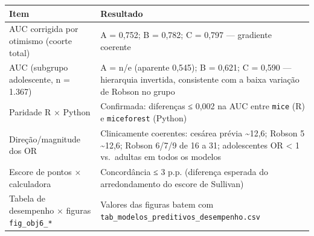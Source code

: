 \documentclass[
]{article}
\begin{document}
\begin{longtable}[]{@{}ll@{}}
\toprule
\begin{minipage}[b]{0.47\columnwidth}\raggedright
Item\strut
\end{minipage} & \begin{minipage}[b]{0.47\columnwidth}\raggedright
Resultado\strut
\end{minipage}\tabularnewline
\midrule
\endhead
\begin{minipage}[t]{0.47\columnwidth}\raggedright
AUC corrigida por otimismo (coorte total)\strut
\end{minipage} & \begin{minipage}[t]{0.47\columnwidth}\raggedright
A = 0,752; B = 0,782; C = 0,797 --- gradiente coerente\strut
\end{minipage}\tabularnewline
\begin{minipage}[t]{0.47\columnwidth}\raggedright
AUC (subgrupo adolescente, n = 1.367)\strut
\end{minipage} & \begin{minipage}[t]{0.47\columnwidth}\raggedright
A = n/e (aparente 0,545); B = 0,621; C = 0,590 --- hierarquia invertida,
consistente com a baixa variação de Robson no grupo\strut
\end{minipage}\tabularnewline
\begin{minipage}[t]{0.47\columnwidth}\raggedright
Paridade R × Python\strut
\end{minipage} & \begin{minipage}[t]{0.47\columnwidth}\raggedright
Confirmada: diferenças ≤ 0,002 na AUC entre \texttt{mice} (R) e
\texttt{miceforest} (Python)\strut
\end{minipage}\tabularnewline
\begin{minipage}[t]{0.47\columnwidth}\raggedright
Direção/magnitude dos OR\strut
\end{minipage} & \begin{minipage}[t]{0.47\columnwidth}\raggedright
Clinicamente coerentes: cesárea prévia \textasciitilde12,6; Robson 5
\textasciitilde12,6; Robson 6/7/9 de 16 a 31; adolescentes OR
\textless{} 1 vs.~adultas em todos os modelos\strut
\end{minipage}\tabularnewline
\begin{minipage}[t]{0.47\columnwidth}\raggedright
Escore de pontos × calculadora\strut
\end{minipage} & \begin{minipage}[t]{0.47\columnwidth}\raggedright
Concordância ≤ 3 p.p. (diferença esperada do arredondamento do escore de
Sullivan)\strut
\end{minipage}\tabularnewline
\begin{minipage}[t]{0.47\columnwidth}\raggedright
Tabela de desempenho × figuras \texttt{fig\_obj6\_*}\strut
\end{minipage} & \begin{minipage}[t]{0.47\columnwidth}\raggedright
Valores das figuras batem com
\texttt{tab\_modelos\_preditivos\_desempenho.csv}\strut
\end{minipage}\tabularnewline
\bottomrule
\end{longtable}
\end{document}
